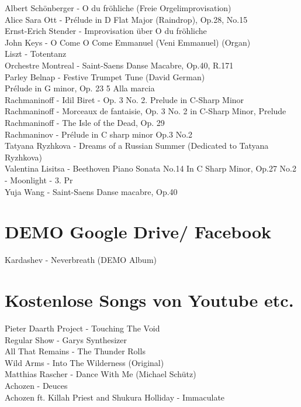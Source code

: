 Albert Schönberger - O du fröhliche (Freie Orgelimprovisation)\\
Alice Sara Ott - Prélude in D Flat Major (Raindrop), Op.28, No.15\\
Ernst-Erich Stender - Improvisation über O du fröhliche\\
John Keys - O Come O Come Emmanuel (Veni Emmanuel) (Organ)\\
Liszt - Totentanz\\
Orchestre Montreal - Saint-Saens Danse Macabre, Op.40, R.171\\
Parley Belnap - Festive Trumpet Tune (David German)\\
Prélude in G minor, Op. 23 5 Alla marcia\\
Rachmaninoff - Idil Biret - Op. 3 No. 2. Prelude in C-Sharp Minor\\
Rachmaninoff - Morceaux de fantaisie, Op. 3 No. 2 in C-Sharp Minor, Prelude\\
Rachmaninoff - The Isle of the Dead, Op. 29\\
Rachmaninov - Prélude in C sharp minor Op.3 No.2\\
Tatyana Ryzhkova - Dreams of a Russian Summer (Dedicated to Tatyana Ryzhkova)\\
Valentina Lisitsa - Beethoven Piano Sonata No.14 In C Sharp Minor, Op.27 No.2 - Moonlight - 3. Pr\\
Yuja Wang - Saint-Saens Danse macabre, Op.40\\

\section{DEMO Google Drive/ Facebook}

Kardashev - Neverbreath (DEMO Album)

\section{Kostenlose Songs von Youtube etc.}

Pieter Daarth Project - Touching The Void\\
Regular Show - Garys Synthesizer\\
All That Remains - The Thunder Rolls\\
Wild Arms - Into The Wilderness (Original)\\
Matthias Rascher - Dance With Me (Michael Schütz)\\
Achozen - Deuces\\
Achozen ft. Killah Priest and Shukura Holliday - Immaculate\\

